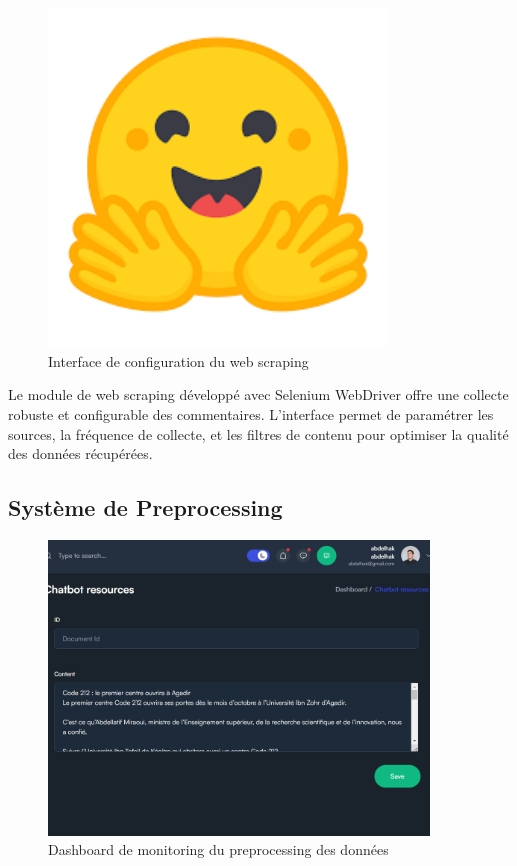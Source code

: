 \begin{figure}[H]
\centering
\includegraphics[width=0.8\textwidth]{assets/images/face.png}
\caption{Interface de configuration du web scraping}
\label{fig:scraping-interface}
\end{figure}

Le module de web scraping développé avec Selenium WebDriver offre une collecte robuste et configurable des commentaires. L'interface permet de paramétrer les sources, la fréquence de collecte, et les filtres de contenu pour optimiser la qualité des données récupérées.

\subsection{Système de Preprocessing}

\begin{figure}[H]
\centering
\includegraphics[width=0.9\textwidth]{assets/images/admin-doc.png}
\caption{Dashboard de monitoring du preprocessing des données}
\label{fig:preprocessing-dashboard}
\end{figure}

